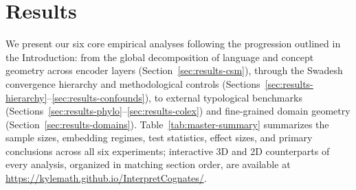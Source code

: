 \section{Results}
\label{sec:results}

We present our six core empirical analyses following the progression outlined in the Introduction: from the global decomposition of language and concept geometry across encoder layers (Section~\ref{sec:results-csm}), through the Swadesh convergence hierarchy and methodological controls (Sections~\ref{sec:results-hierarchy}--\ref{sec:results-confounds}), to external typological benchmarks (Sections~\ref{sec:results-phylo}--\ref{sec:results-colex}) and fine-grained domain geometry (Section~\ref{sec:results-domains}).
Table~\ref{tab:master-summary} summarizes the sample sizes, embedding regimes, test statistics, effect sizes, and primary conclusions across all six experiments; interactive 3D and 2D counterparts of every analysis, organized in matching section order, are available at \url{https://kylemath.github.io/InterpretCognates/}.

